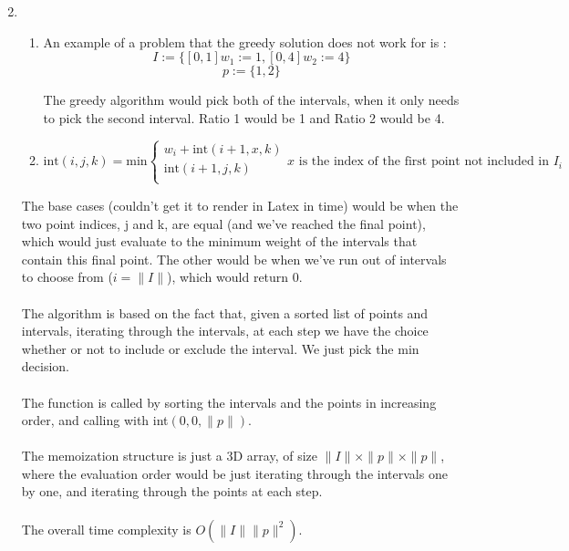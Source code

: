 
\usepackage{amsmath, verbatim, tikz, float, pgfplots, framed}
\usepackage[]{algorithm2e}

\usetikzlibrary{arrows,automata}

\oddsidemargin 0in
\evensidemargin 0in
\textwidth 6.5in
\topmargin -0.5in
\textheight 9.0in
\newcommand{\norm}[1]{\left\lVert #1 \right\rVert}


\pagestyle{myheadings}

\begin{enumerate}
  \setcounter{enumi}{1}
\item
  \begin{enumerate}
    \item
      An example of a problem that the greedy solution does not work for is : \\
      $$I := \{[0,1] w_1 := 1, [0,4] w_2 := 4\}$$
      $$p := \{1, 2\}$$
      
      The greedy algorithm would pick both of the intervals, when it only needs to pick the second interval. Ratio 1 would be 1 and Ratio 2 would be 4.

    \item
      \begin{displaymath}
        \text{int}(i,j,k) = \text{min}\left\{
          \begin{array}{lr}
            w_i + \text{int}(i+1,x,k)\\
            \text{int}(i+1,j,k)\\
          \end{array}
            x \text{ is the index of the first point not included in } I_i
        \right.
      \end{displaymath}
    \end{enumerate}
    The base cases (couldn't get it to render in Latex in time) would be when the two point indices, j and k, are equal (and we've reached the final point), which would just evaluate to the minimum weight of the intervals that contain this final point. The other would be when we've run out of intervals to choose from ($i = \|I\|$), which would return 0.\\\\
    The algorithm is based on the fact that, given a sorted list of points and intervals, iterating through the intervals, at each step we have the choice whether or not to include or exclude the interval. We just pick the min decision.\\\\
    The function is called by sorting the intervals and the points in increasing order, and calling with int$(0,0,\|p\|)$.\\\\    
    The memoization structure is just a 3D array, of size $\|I\| \times \|p\| \times \|p\|$, where the evaluation order would be just iterating through the intervals one by one, and iterating through the points at each step.\\\\
    The overall time complexity is $O(\|I\|\|p\|^2)$.
  
\end{enumerate}
